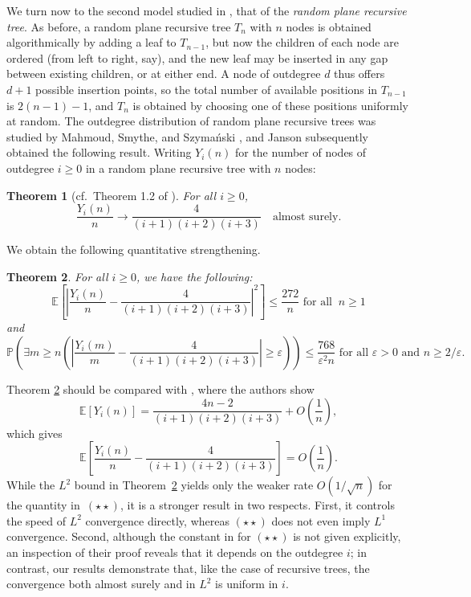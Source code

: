 \documentclass[12pt]{amsart}
\newtheorem{theorem}{Theorem}[section]
\theoremstyle{definition}
\theoremstyle{remark}
\newcommand{\PP}{\mathbb{P}}
\newcommand{\EE}{\mathbb{E}}
\newcommand{\eps}{\varepsilon}
\begin{document}
We turn now to the second model studied in \cite{janson2005asymptotic}, that of 
the \emph{random plane recursive tree}. As before, a random plane recursive tree 
$T_n$ with $n$ nodes is obtained algorithmically by adding a leaf to $T_{n-1}$, but now the 
children of each node are ordered (from left to right, say), and the new leaf 
may be inserted in any gap between existing children, or at either end. A node 
of outdegree $d$ thus offers $d+1$ possible insertion points, so the total number 
of available positions in $T_{n-1}$ is $2(n-1) - 1$, and $T_n$ is obtained by 
choosing one of these positions uniformly at random. The outdegree distribution 
of random plane recursive trees was studied by Mahmoud, Smythe, and 
Szyma\'nski \cite{mahmoud1993structure}, and Janson \cite{janson2005asymptotic} subsequently obtained the following result. Writing 
$Y_i(n)$ for the number of nodes of outdegree $i \geq 0$ in a random plane 
recursive tree with $n$ nodes:

\begin{theorem}[{cf.\ Theorem 1.2 of \cite{janson2005asymptotic}}]
\label{thrm:jan:plane}
    For all $i \geq 0$,
    \[
    \frac{Y_i(n)}{n} \to \frac{4}{(i+1)(i+2)(i+3)} \quad \text{almost surely.}
    \]
\end{theorem}

We obtain the following quantitative strengthening.

\begin{theorem}
\label{thrm:main:plane}
    For all $i\geq 0$, we have the following:
    \[
    \EE\left[ \left| \frac{Y_i(n)}{n} - \frac{4}{(i+1)(i+2)(i+3)} \right|^2 \right]\leq \frac{272}{n} \text{ for all }\ n\geq 1
    \]
    and
    \[
    \PP\left( \exists m\geq  n \left( \left|\frac{Y_i(m)}{m} - \frac{4}{(i+1)(i+2)(i+3)}\right|\geq \eps \right) \right)\leq \frac{768}{\eps^2n} \text{ for all } \eps>0 \text{ and } n\geq 2/\eps.
    \]
\end{theorem}

Theorem \ref{thrm:main:plane} should be compared with \cite[Theorem 3]{mahmoud1993structure}, where the authors show
\[
\EE[Y_i(n)] = \frac{4n-2}{(i+1)(i+2)(i+3)} + O\!\left(\frac{1}{n}\right),
\]
which gives
\[
\EE\left[\frac{Y_i(n)}{n} - \frac{4}{(i+1)(i+2)(i+3)}\right] 
= O\!\left(\frac{1}{n}\right). \tag{$\star\star$}
\]
While the $L^2$ bound in Theorem~\ref{thrm:main:plane} yields only the weaker 
rate $O(1/\sqrt{n})$ for the quantity in~$(\star\star)$, it is a stronger result 
in two respects. First, it controls the speed of $L^2$ convergence directly, 
whereas $(\star\star)$ does not even imply $L^1$ convergence. Second, although the constant in \cite{mahmoud1993structure} for $(\star\star)$ is not given explicitly, an 
inspection of their proof reveals that it depends on the outdegree $i$; in contrast, our results demonstrate that, like the case of recursive trees, the convergence both almost surely and in $L^2$ is uniform in  $i$.\\
\end{document}
